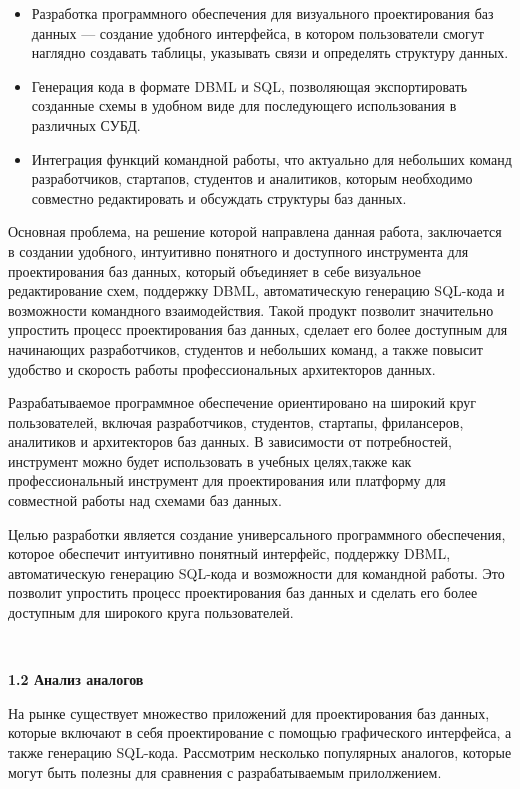 \begin{itemize}
    \item Разработка программного обеспечения для визуального проектирования баз данных — создание удобного интерфейса, в котором пользователи смогут наглядно создавать таблицы, указывать связи и определять структуру данных.
    \item Генерация кода в формате DBML и SQL, позволяющая экспортировать созданные схемы в удобном виде для последующего использования в различных СУБД.
    \item Интеграция функций командной работы, что актуально для небольших команд разработчиков, стартапов, студентов и аналитиков, которым необходимо совместно редактировать и обсуждать структуры баз данных.
\end{itemize}

Основная проблема, на решение которой направлена данная работа, заключается в создании удобного, интуитивно понятного и доступного инструмента для проектирования баз данных, который объединяет в себе визуальное редактирование схем, поддержку DBML, автоматическую генерацию SQL-кода и возможности командного взаимодействия. Такой продукт позволит значительно упростить процесс проектирования баз данных, сделает его более доступным для начинающих разработчиков, студентов и небольших команд, а также повысит удобство и скорость работы профессиональных архитекторов данных.

Разрабатываемое программное обеспечение ориентировано на широкий круг пользователей, включая разработчиков, студентов, стартапы, фрилансеров, аналитиков и архитекторов баз данных. В зависимости от потребностей, инструмент можно будет использовать в учебных целях,также как профессиональный инструмент для проектирования или платформу для совместной работы над схемами баз данных.

Целью разработки является создание универсального программного обеспечения, которое обеспечит интуитивно понятный интерфейс, поддержку DBML, автоматическую генерацию SQL-кода и возможности для командной работы. Это позволит упростить процесс проектирования баз
данных и сделать его более доступным для широкого круга пользователей.

\

\textbf{\large 1.2 Анализ аналогов}

На рынке существует множество приложений для проектирования баз данных, которые включают в себя проектирование с помощью графического интерфейса, а также генерацию SQL-кода. Рассмотрим несколько популярных аналогов, которые могут быть полезны для сравнения с разрабатываемым прилолжением.

